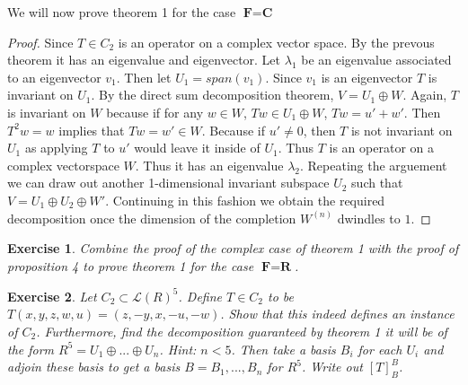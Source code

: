 \documentclass{article}
\theoremstyle{problemstyle}
\newtheorem{exercise}{Exercise}
\newtheorem{definition}{Definition}
\begin{document}
We will now prove theorem 1 for the case $\textbf{F} = \textbf{C}$

\begin{proof}
Since $T \in C_2$ is an operator on a complex vector space. By the prevous theorem it has an eigenvalue and eigenvector. Let $\lambda_1$ be an eigenvalue associated to an eigenvector $v_1$. Then let $U_1 = span(v_1)$. Since $v_1$ is an eigenvector $T$ is invariant on $U_1$.  By the direct sum decomposition theorem, $V = U_1 \oplus W$. Again, $T$ is invariant on $W$ because if for any $w \in W$, $Tw \in U_1 \oplus W$, $Tw = u'+w'$. Then $T^2w = w$ implies that $Tw = w' \in W$. Because if $u' \neq 0$, then $T$ is not invariant on $U_1$ as applying $T$ to $u'$ would leave it inside of $U_1$. Thus $T$ is an operator on a complex vectorspace $W$. Thus it has an eigenvalue $\lambda_2$. Repeating the arguement we can draw out another 1-dimensional invariant subspace $U_2$ such that $V = U_1 \oplus U_2 \oplus W'$. Continuing in this fashion we obtain the required decomposition once the dimension of the completion $W^{(n)}$ dwindles to $1$. 
\end{proof}

\begin{exercise}
Combine the proof of the complex case of theorem 1 with the proof of proposition 4 to prove theorem 1 for the case $\textbf{F} = \textbf{R}$. 
\end{exercise}

\begin{exercise}
Let $C_2 \subset \mathscr{L}(R)^5$. Define $T \in C_2$ to be $T(x,y,z,w,u) = (z,-y,x,-u,-w)$. Show that this indeed defines an instance of $C_2$. Furthermore, find the decomposition guaranteed by theorem 1 it will be of the form $R^5 = U_1 \oplus ... \oplus U_n$. Hint: $n < 5$. Then take a basis $B_i$ for each $U_i$ and adjoin these basis to get a basis $B = B_1,...,B_n$ for $R^5$. Write out $[T]^B_B$.  
\end{exercise}



\end{document}
